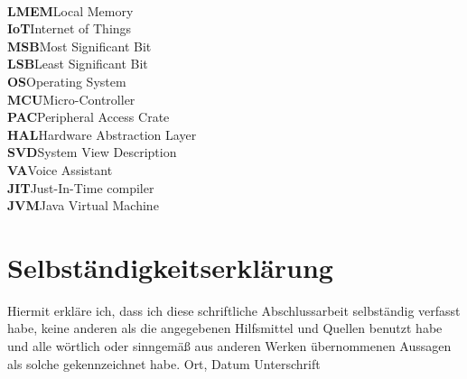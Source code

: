 \documentclass[oneside,11pt,a4paper,twoside]{scrreprt}
\begin{document}
\begin{tabbing}
\\
\textbf{LMEM}\>Local Memory
\\
\textbf{IoT}\>Internet of Things
\\
\textbf{MSB}\>Most Significant Bit
\\
\textbf{LSB}\>Least Significant Bit
\\
\textbf{OS}\>Operating System
\\
\textbf{MCU}\>Micro-Controller
\\
\textbf{PAC}\>Peripheral Access Crate
\\
\textbf{HAL}\>Hardware Abstraction Layer
\\
\textbf{SVD}\>System View Description
\\
\textbf{VA}\>Voice Assistant
\\
\textbf{JIT}\>Just-In-Time compiler
\\
\textbf{JVM}\>Java Virtual Machine
\end{tabbing}
\cleardoublepage

\small\normalsize
{}
\listoffigures
\small\normalsize
\cleardoublepage

\small\normalsize
{}
\listoftables
\small\normalsize
\cleardoublepage

\thispagestyle{empty}
\section*{Selbständigkeitserklärung}
Hiermit erkläre ich, dass ich diese schriftliche Abschlussarbeit selbständig verfasst habe, keine anderen als die angegebenen Hilfsmittel und Quellen benutzt habe und alle wörtlich oder sinngemä{\ss} aus anderen Werken übernommenen Aussagen als solche gekennzeichnet habe.
\vskip 3cm
Ort, Datum	\hfill Unterschrift \hfill
\end{document}
